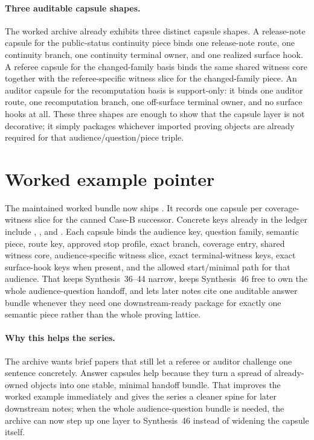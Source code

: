 \documentclass[11pt]{article}
\begin{document}
\paragraph{Three auditable capsule shapes.}
The worked archive already exhibits three distinct capsule shapes.
A release-note capsule for the public-status continuity piece binds one release-note route, one continuity branch, one continuity terminal owner, and one realized surface hook.
A referee capsule for the changed-family basis binds the same shared witness core together with the referee-specific witness slice for the changed-family piece.
An auditor capsule for the recomputation basis is support-only: it binds one auditor route, one recomputation branch, one off-surface terminal owner, and no surface hooks at all.
These three shapes are enough to show that the capsule layer is not decorative; it simply packages whichever imported proving objects are already required for that audience/question/piece triple.

\section{Worked example pointer}
The maintained worked bundle now ships .\cite{series:workedexample}
It records one capsule per coverage-witness slice for the canned Case-B successor.
Concrete keys already in the ledger include , , and .
Each capsule binds the audience key, question family, semantic piece, route key, approved stop profile, exact branch, coverage entry, shared witness core, audience-specific witness slice, exact terminal-witness keys, exact surface-hook keys when present, and the allowed start/minimal path for that audience.
That keeps Synthesis~36--44 narrow, keeps Synthesis~46 free to own the whole audience-question handoff, and lets later notes cite one auditable answer bundle whenever they need one downstream-ready package for exactly one semantic piece rather than the whole proving lattice.\cite{series:challengeanswersheets}

\paragraph{Why this helps the series.}
The archive wants brief papers that still let a referee or auditor challenge one sentence concretely.
Answer capsules help because they turn a spread of already-owned objects into one stable, minimal handoff bundle.
That improves the worked example immediately and gives the series a cleaner spine for later downstream notes; when the whole audience-question bundle is needed, the archive can now step up one layer to Synthesis~46 instead of widening the capsule itself.\cite{series:challengeanswersheets}
\end{document}

